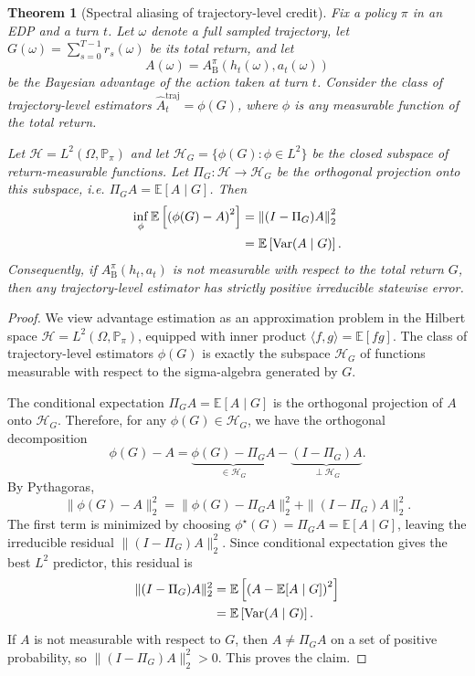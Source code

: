 \documentclass[11pt]{article}
\theoremstyle{plain}
\newtheorem{theorem}{Theorem}[section]
\theoremstyle{definition}
\theoremstyle{remark}
\begin{document}
\begin{theorem}[Spectral aliasing of trajectory-level credit]
\label{thm:spectral-aliasing}
Fix a policy \(\pi\) in an EDP and a turn \(t\). Let \(\omega\) denote a full sampled trajectory, let \(G(\omega)=\sum_{s=0}^{T-1}r_s(\omega)\) be its total return, and let
\[
    A(\omega)
    =
    A_{\mathrm{B}}^\pi(h_t(\omega),a_t(\omega))
\]
be the Bayesian advantage of the action taken at turn \(t\). Consider the class of trajectory-level estimators \(\widehat A_t^{\mathrm{traj}}=\phi(G)\), where \(\phi\) is any measurable function of the total return.

Let \(\mathcal{H}=L^2(\Omega,\mathbb{P}_\pi)\) and let \(\mathcal{H}_G=\{\phi(G):\phi\in L^2\}\) be the closed subspace of return-measurable functions. Let \(\Pi_G:\mathcal{H}\rightarrow \mathcal{H}_G\) be the orthogonal projection onto this subspace, i.e. \(\Pi_G A=\mathbb{E}[A\mid G]\). Then
\begin{align}
    \inf_{\phi}
    \mathbb{E}\left[
        \left(
        \phi(G)-A
        \right)^2
    \right]
    &\notag=
    \left\|
        (I-\Pi_G)A
    \right\|_2^2\\
    &\notag=
    \mathbb{E}\left[
        \operatorname{Var}(A\mid G)
    \right].
\end{align}
Consequently, if \(A_{\mathrm{B}}^\pi(h_t,a_t)\) is not measurable with respect to the total return \(G\), then any trajectory-level estimator has strictly positive irreducible statewise error.
\end{theorem}

\begin{proof}
We view advantage estimation as an approximation problem in the Hilbert space \(\mathcal{H}=L^2(\Omega,\mathbb{P}_\pi)\), equipped with inner product \(\langle f,g\rangle=\mathbb{E}[fg]\). The class of trajectory-level estimators \(\phi(G)\) is exactly the subspace \(\mathcal{H}_G\) of functions measurable with respect to the sigma-algebra generated by \(G\).

The conditional expectation \(\Pi_G A=\mathbb{E}[A\mid G]\) is the orthogonal projection of \(A\) onto \(\mathcal{H}_G\). Therefore, for any \(\phi(G)\in \mathcal{H}_G\), we have the orthogonal decomposition
\[
    \phi(G)-A
    =
    \underbrace{\phi(G)-\Pi_G A}_{\in \mathcal{H}_G}
    -
    \underbrace{(I-\Pi_G)A}_{\perp \mathcal{H}_G}.
\]
By Pythagoras,
\[
    \|\phi(G)-A\|_2^2
    =
    \|\phi(G)-\Pi_G A\|_2^2
    +
    \|(I-\Pi_G)A\|_2^2.
\]
The first term is minimized by choosing \(\phi^\star(G)=\Pi_G A=\mathbb{E}[A\mid G]\), leaving the irreducible residual \(\|(I-\Pi_G)A\|_2^2\). Since conditional expectation gives the best \(L^2\) predictor, this residual is
\begin{align}
    \|(I-\Pi_G)A\|_2^2
    &\notag=
    \mathbb{E}\left[
        \left(A-\mathbb{E}[A\mid G]\right)^2
    \right]\\
    &\notag=
    \mathbb{E}\left[
        \operatorname{Var}(A\mid G)
    \right].
\end{align}
If \(A\) is not measurable with respect to \(G\), then \(A\neq \Pi_GA\) on a set of positive probability, so \(\|(I-\Pi_G)A\|_2^2>0\). This proves the claim.
\end{proof}
\end{document}
